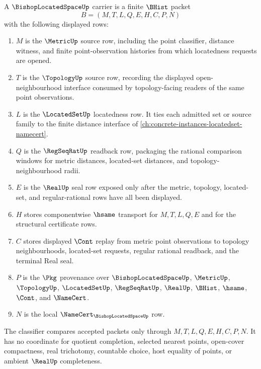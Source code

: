 \begin{definition}
\label{def:bishop-located-space-carrier}
A $\BishopLocatedSpaceUp$ carrier is a finite $\BHist$ packet
$$
B=(M,T,L,Q,E,H,C,P,N)
$$
with the following displayed rows:
\begin{enumerate}
\item $M$ is the $\MetricUp$ source row, including the point classifier, distance witness, and finite point-observation histories from which locatedness requests are opened.
\item $T$ is the $\TopologyUp$ source row, recording the displayed open-neighbourhood interface consumed by topology-facing readers of the same point observations.
\item $L$ is the $\LocatedSetUp$ locatedness row. It ties each admitted set or source family to the finite distance interface of \autoref{ch:concrete-instances-locatedset-namecert}.
\item $Q$ is the $\RegSeqRatUp$ readback row, packaging the rational comparison windows for metric distances, located-set distances, and topology-neighbourhood radii.
\item $E$ is the $\RealUp$ seal row exposed only after the metric, topology, located-set, and regular-rational rows have all been displayed.
\item $H$ stores componentwise $\hsame$ transport for $M,T,L,Q,E$ and for the structural certificate rows.
\item $C$ stores displayed $\Cont$ replay from metric point observations to topology neighbourhoods, located-set requests, regular rational readback, and the terminal Real seal.
\item $P$ is the $\Pkg$ provenance over $\BishopLocatedSpaceUp$, $\MetricUp$, $\TopologyUp$, $\LocatedSetUp$, $\RegSeqRatUp$, $\RealUp$, $\BHist$, $\hsame$, $\Cont$, and $\NameCert$.
\item $N$ is the local $\NameCert_{\BishopLocatedSpaceUp}$ row.
\end{enumerate}
The classifier compares accepted packets only through $M,T,L,Q,E,H,C,P,N$. It has no coordinate for quotient completion, selected nearest points, open-cover compactness, real trichotomy, countable choice, host equality of points, or ambient $\RealUp$ completeness.
\end{definition}

